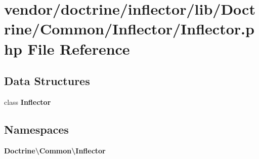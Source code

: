 \section{vendor/doctrine/inflector/lib/\+Doctrine/\+Common/\+Inflector/\+Inflector.php File Reference}
\label{_inflector_8php}
\subsection*{Data Structures}
\begin{DoxyCompactItemize}
\item 
class {\bf Inflector}
\end{DoxyCompactItemize}
\subsection*{Namespaces}
\begin{DoxyCompactItemize}
\item 
 {\bf Doctrine\textbackslash{}\+Common\textbackslash{}\+Inflector}
\end{DoxyCompactItemize}
